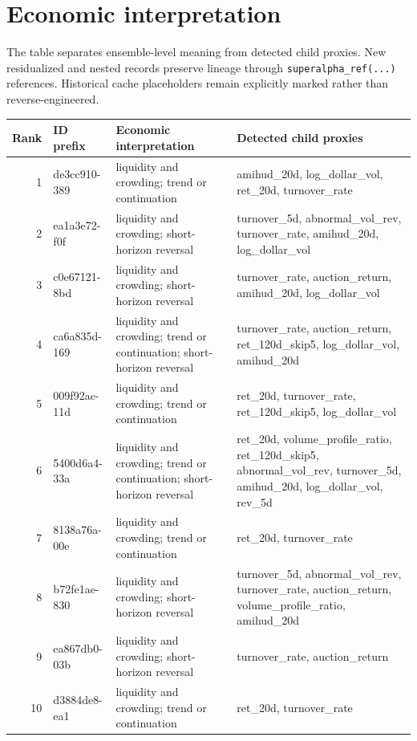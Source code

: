 \documentclass[10pt,a4paper]{article}
\begin{document}
\section{Economic interpretation}
The table separates ensemble-level meaning from detected child proxies. New residualized and nested records
preserve lineage through \texttt{superalpha\_ref(...)} references. Historical cache placeholders remain
explicitly marked rather than reverse-engineered.

\footnotesize
\begin{longtable}{r l >{\raggedright\arraybackslash}p{5.3cm} >{\raggedright\arraybackslash}p{5.2cm}}
\toprule Rank & ID prefix & Economic interpretation & Detected child proxies \\\midrule
1 & de3cc910-389 & liquidity and crowding; trend or continuation & amihud\_20d, log\_dollar\_vol, ret\_20d, turnover\_rate \\
2 & ea1a3e72-f0f & liquidity and crowding; short-horizon reversal & turnover\_5d, abnormal\_vol\_rev, turnover\_rate, amihud\_20d, log\_dollar\_vol \\
3 & c0e67121-8bd & liquidity and crowding; short-horizon reversal & turnover\_rate, auction\_return, amihud\_20d, log\_dollar\_vol \\
4 & ca6a835d-169 & liquidity and crowding; trend or continuation; short-horizon reversal & turnover\_rate, auction\_return, ret\_120d\_skip5, log\_dollar\_vol, amihud\_20d \\
5 & 009f92ac-11d & liquidity and crowding; trend or continuation & ret\_20d, turnover\_rate, ret\_120d\_skip5, log\_dollar\_vol \\
6 & 5400d6a4-33a & liquidity and crowding; trend or continuation; short-horizon reversal & ret\_20d, volume\_profile\_ratio, ret\_120d\_skip5, abnormal\_vol\_rev, turnover\_5d, amihud\_20d, log\_dollar\_vol, rev\_5d \\
7 & 8138a76a-00e & liquidity and crowding; trend or continuation & ret\_20d, turnover\_rate \\
8 & b72fe1ae-830 & liquidity and crowding; short-horizon reversal & turnover\_5d, abnormal\_vol\_rev, turnover\_rate, auction\_return, volume\_profile\_ratio, amihud\_20d \\
9 & ea867db0-03b & liquidity and crowding; short-horizon reversal & turnover\_rate, auction\_return \\
10 & d3884de8-ea1 & liquidity and crowding; trend or continuation & ret\_20d, turnover\_rate \\
\bottomrule
\end{longtable}
\normalsize
\end{document}
